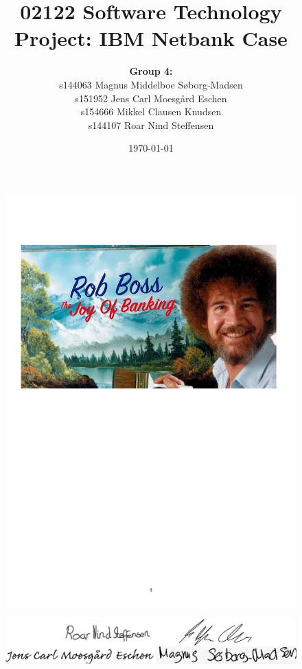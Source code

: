 \title{02122 Software Technology Project: IBM Netbank Case}
\author{\textbf{Group 4:} \\ 
s144063	Magnus Middelboe Søborg-Madsen \\
s151952	Jens Carl Moesgård Eschen \\
s154666	Mikkel Clausen Knudsen \\
s144107	Roar Nind Steffensen}
\date{\today}

\maketitle

\begin{figure}[H]
    \centering
    \includegraphics[width=\linewidth]{figures/Gruppe4_logo.pdf}
    \label{fig:logo}
\end{figure}

\begin{figure}[H]
    \centering
    \includegraphics[width=0.8\linewidth, height=18mm]{figures/underskrifter.png}
    \label{fig:underskrifter}
\end{figure}

